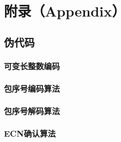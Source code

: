 \section{附录（Appendix）}

\subsection{伪代码}
\subsubsection{可变长整数编码}
\subsubsection{包序号编码算法}
\subsubsection{包序号解码算法}
\subsubsection{ECN确认算法}
